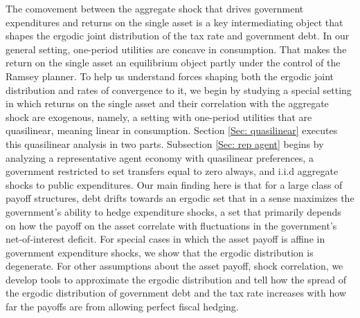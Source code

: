 \documentclass[thmsb,11pt]{article}
\begin{document}
The comovement between the aggregate shock that drives government expenditures and returns
on the single asset is a key intermediating object that shapes the ergodic joint distribution of the tax rate and government debt.  In our general setting, one-period utilities are concave in consumption. That makes  the return on the single asset an equilibrium object partly under the control of the Ramsey planner.
 To help us understand forces shaping both the ergodic joint distribution and rates of convergence to it,  we begin by
studying a special setting in which returns on the single asset and their correlation with the aggregate shock are exogenous, namely,
a setting with one-period utilities  that are quasilinear, meaning linear in consumption.
Section \ref{Sec: quasilinear} executes this quasilinear  analysis in two parts.
Subsection \ref{Sec: rep agent} begins by analyzing
a representative agent economy with quasilinear preferences, a government restricted to set transfers equal to zero always, and i.i.d aggregate shocks to public expenditures.
  Our main finding here is  that for a large class of payoff structures,
debt  drifts towards an ergodic set that in a sense maximizes the  government's ability to hedge expenditure shocks,  a set
that  primarily depends on how the payoff on the asset  correlate with  fluctuations in the
 government's net-of-interest deficit. 
For special cases in which the asset payoff is affine in government expenditure shocks, we
show that the ergodic distribution is degenerate. For other assumptions about the asset payoff, shock correlation, we develop tools to approximate the ergodic distribution
 and tell  how the spread of the ergodic distribution of government  debt and the tax rate increases with how far the payoffs  are from allowing perfect fiscal hedging.
\end{document}
